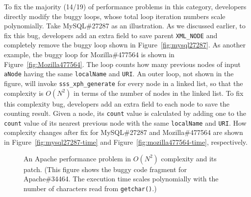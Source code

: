 To fix the majority (14/19) of performance problems in this category,
developers directly modify the buggy loops, 
whose total loop iteration numbers scale polynomially.
Take MySQL\#27287 as an illustration.
As we discussed earlier, to fix this bug,
developers add an extra field to save parent \texttt{XML\_NODE}
and completely remove the buggy loop shown in Figure~\ref{fig:mysql27287}.
As another example, the buggy loop for Mozilla\#477564 is shown in Figure~\ref{fig:Mozilla477564}.
The loop counts how many previous nodes of input \texttt{aNode} 
having the same \texttt{localName} and \texttt{URI}.
An outer loop, not shown in the figure, 
will invoke \texttt{sss\_xph\_generate} for every node in a linked list, 
so that the complexity is $O(N^2)$ in terms of the number of nodes in the linked list.
To fix this complexity bug, developers add an extra field to each node to 
save the counting result. 
Given a node, 
its \texttt{count} value is calculated by adding one 
to the \texttt{count} value of 
its nearest previous node with the same \texttt{localName} and \texttt{URI}.  
How complexity changes after fix for MySQL\#27287 and Mozilla\#477564 are 
shown in Figure~\ref{fig:mysql27287-time} and Figure~\ref{fig:mozilla477564-time}, respectively. 

\begin{figure}
\centering
{}
  \mbox{}
\caption{An Apache performance problem in $O(N^2)$ complexity and its patch. 
\footnotesize{(This figure shows the buggy code fragment for Apache\#34464. 
 The execution time scales polynomially with the number of characters read from \texttt{getchar()}.)}}
\vspace{-0.05in}
\label{fig:apache34464}
\vspace{-0.05in}
\end{figure}







